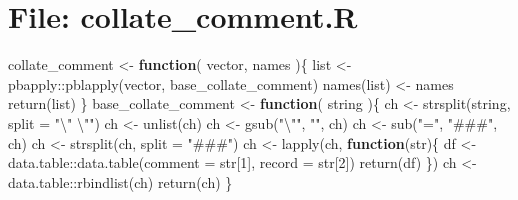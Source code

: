 \documentclass[
]{article}
\newenvironment{Shaded}{\begin{snugshade}}{\end{snugshade}}
\newcommand{\AttributeTok}[1]{\textcolor[rgb]{0.77,0.63,0.00}{#1}}
\newcommand{\ControlFlowTok}[1]{\textcolor[rgb]{0.13,0.29,0.53}{\textbf{#1}}}
\newcommand{\DecValTok}[1]{\textcolor[rgb]{0.00,0.00,0.81}{#1}}
\newcommand{\FunctionTok}[1]{\textcolor[rgb]{0.00,0.00,0.00}{#1}}
\newcommand{\NormalTok}[1]{#1}
\newcommand{\OtherTok}[1]{\textcolor[rgb]{0.56,0.35,0.01}{#1}}
\newcommand{\SpecialCharTok}[1]{\textcolor[rgb]{0.00,0.00,0.00}{#1}}
\newcommand{\StringTok}[1]{\textcolor[rgb]{0.31,0.60,0.02}{#1}}
\begin{document}
\hypertarget{file-collate_comment.r}{%
\section{File: collate\_comment.R}\label{file-collate_comment.r}}

\begin{Shaded}
\begin{Highlighting}[]
\NormalTok{collate\_comment }\OtherTok{\textless{}{-}} 
  \ControlFlowTok{function}\NormalTok{(}
\NormalTok{           vector,}
\NormalTok{           names}
\NormalTok{           )\{}
\NormalTok{    list }\OtherTok{\textless{}{-}}\NormalTok{ pbapply}\SpecialCharTok{::}\FunctionTok{pblapply}\NormalTok{(vector, base\_collate\_comment)}
    \FunctionTok{names}\NormalTok{(list) }\OtherTok{\textless{}{-}}\NormalTok{ names}
    \FunctionTok{return}\NormalTok{(list)}
\NormalTok{  \}}
\NormalTok{base\_collate\_comment }\OtherTok{\textless{}{-}} 
  \ControlFlowTok{function}\NormalTok{(}
\NormalTok{           string}
\NormalTok{           )\{}
\NormalTok{    ch }\OtherTok{\textless{}{-}} \FunctionTok{strsplit}\NormalTok{(string, }\AttributeTok{split =} \StringTok{"}\SpecialCharTok{\textbackslash{}"}\StringTok{ }\SpecialCharTok{\textbackslash{}"}\StringTok{"}\NormalTok{)}
\NormalTok{    ch }\OtherTok{\textless{}{-}} \FunctionTok{unlist}\NormalTok{(ch)}
\NormalTok{    ch }\OtherTok{\textless{}{-}} \FunctionTok{gsub}\NormalTok{(}\StringTok{"}\SpecialCharTok{\textbackslash{}"}\StringTok{"}\NormalTok{, }\StringTok{""}\NormalTok{, ch)}
\NormalTok{    ch }\OtherTok{\textless{}{-}} \FunctionTok{sub}\NormalTok{(}\StringTok{"="}\NormalTok{, }\StringTok{"\#\#\#"}\NormalTok{, ch)}
\NormalTok{    ch }\OtherTok{\textless{}{-}} \FunctionTok{strsplit}\NormalTok{(ch, }\AttributeTok{split =} \StringTok{"\#\#\#"}\NormalTok{)}
\NormalTok{    ch }\OtherTok{\textless{}{-}} \FunctionTok{lapply}\NormalTok{(ch, }\ControlFlowTok{function}\NormalTok{(str)\{}
\NormalTok{               df }\OtherTok{\textless{}{-}}\NormalTok{ data.table}\SpecialCharTok{::}\FunctionTok{data.table}\NormalTok{(}\AttributeTok{comment =}\NormalTok{ str[}\DecValTok{1}\NormalTok{], }\AttributeTok{record =}\NormalTok{ str[}\DecValTok{2}\NormalTok{])}
               \FunctionTok{return}\NormalTok{(df)}
\NormalTok{           \})}
\NormalTok{    ch }\OtherTok{\textless{}{-}}\NormalTok{ data.table}\SpecialCharTok{::}\FunctionTok{rbindlist}\NormalTok{(ch)}
    \FunctionTok{return}\NormalTok{(ch)}
\NormalTok{  \}}
\end{Highlighting}
\end{Shaded}
\end{document}
